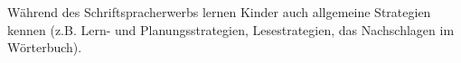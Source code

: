 Während des Schriftspracherwerbs lernen Kinder auch allgemeine Strategien kennen (z.B. Lern- und Planungsstrategien, Lesestrategien, das Nachschlagen im Wörterbuch).